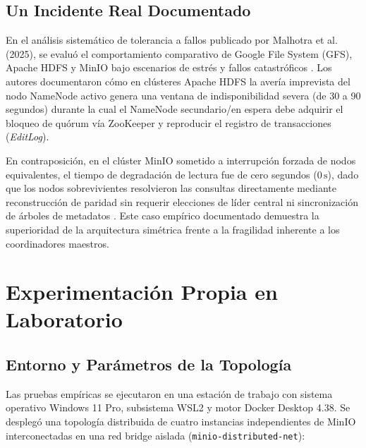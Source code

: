 \documentclass[12pt,a4paper]{article}
\begin{document}
\subsection{Un Incidente Real Documentado}
En el análisis sistemático de tolerancia a fallos publicado por Malhotra et al. (2025), se evaluó el comportamiento comparativo de Google File System (GFS), Apache HDFS y MinIO bajo escenarios de estrés y fallos catastróficos \cite{malhotra2025evaluating}. Los autores documentaron cómo en clústeres Apache HDFS la avería imprevista del nodo NameNode activo genera una ventana de indisponibilidad severa (de 30 a 90 segundos) durante la cual el NameNode secundario/en espera debe adquirir el bloqueo de quórum vía ZooKeeper y reproducir el registro de transacciones (\emph{EditLog}). 

En contraposición, en el clúster MinIO sometido a interrupción forzada de nodos equivalentes, el tiempo de degradación de lectura fue de cero segundos ($0\,\text{s}$), dado que los nodos sobrevivientes resolvieron las consultas directamente mediante reconstrucción de paridad sin requerir elecciones de líder central ni sincronización de árboles de metadatos \cite{malhotra2025evaluating}. Este caso empírico documentado demuestra la superioridad de la arquitectura simétrica frente a la fragilidad inherente a los coordinadores maestros.

\section{Experimentación Propia en Laboratorio}

\subsection{Entorno y Parámetros de la Topología}
Las pruebas empíricas se ejecutaron en una estación de trabajo con sistema operativo Windows 11 Pro, subsistema WSL2 y motor Docker Desktop 4.38. Se desplegó una topología distribuida de cuatro instancias independientes de MinIO interconectadas en una red bridge aislada (\texttt{minio-distributed-net}):
\end{document}
